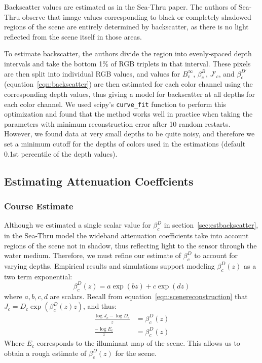 \documentclass[10pt,twocolumn,letterpaper]{article}
\begin{document}
Backscatter values are estimated as in the Sea-Thru paper.
The authors of Sea-Thru observe that image values corresponding to black
or completely shadowed regions of the scene are entirely determined by
backscatter, as there is no light reflected from the scene itself in those
areas.

To estimate backscatter, the authors divide the region into evenly-spaced depth
intervals and take the bottom 1\% of RGB triplets in that interval. These pixels
are then split into individual RGB values, and values for $B^\infty_c$, $\beta^B_c$,
$J'_c$, and $\beta^{D'}_c$ (equation~\ref{eqn:backscatter}) are then estimated for each color channel using the
corresponding depth values, thus giving a model for backscatter at all depths for
each color channel. We used scipy's \texttt{curve\_fit} function to perform this optimization
and found that the method works well in practice when taking the parameters with minimum reconstruction
error after 10 random restarts. However, we found data at very small depths
to be quite noisy, and therefore we set a minimum cutoff for the depths of colors used in
the estimations (default 0.1st percentile of the depth values).

\subsection{Estimating Attenuation Coeffcients}
\subsubsection*{Course Estimate}
Although we estimated a single scalar value for $\beta^D_c$ in section~\ref{sec:estbackscatter},
in the Sea-Thru model the wideband attenuation coefficients take into account regions of the scene
not in shadow, thus reflecting light to the sensor through the
water medium. Therefore, we must refine our estimate of $\beta^D_c$ to account for varying depths.
Empirical results and simulations support modeling $\beta^D_c(z)$ as a two term exponential:
\begin{equation}
\label{eq:attenuation}
    \beta^D_c(z) = a \exp(b z) + c \exp(d z)
\end{equation}
where $a, b, c, d$ are scalars. Recall from equation~\ref{eqn:scenereconstruction} that
$J_c = D_c \exp(\beta_c^D(z)z)$, and thus:
\begin{align}
\label{eqn:courseest}
    \frac{\log{J_c} - \log{D_c}}{z} &= \beta_c^D(z) \nonumber \\
    \frac{-\log{E_c}}{z} &= \beta_c^D(z)
\end{align}
Where $E_c$ corresponds to the illuminant map of the scene. This allows us to obtain
a rough estimate of $\beta_c^D(z)$ for the scene.
\end{document}

